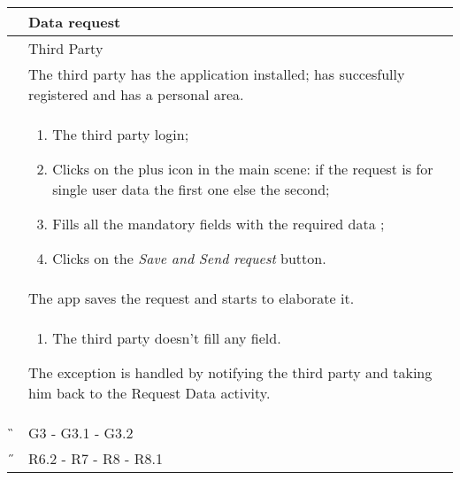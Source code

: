 \begin{center}
	\begin{longtable}{ | p{} | p{} | }
		\hline
		 \A &  Data request\\ 

		\hline
		 \B &  Third Party \\ 

		\hline
  		 \C &  The third party has the application installed; has succesfully registered and has a personal area.\\

		\hline
		\D & \begin{enumerate}
			\item The third party login;
			\item Clicks on the plus icon in the main scene: if the request is for single user data the first one else the second;
			\item Fills all the mandatory fields with the required data  ;
			\item Clicks on the \textit{Save and Send request} button.
		\end{enumerate} \\

		\hline
		\E & The app saves the request and starts to elaborate it.\\

		\hline
		\F & \begin{enumerate}
			\item The third party doesn't fill any field.
		\end{enumerate} The exception is handled by notifying the third party and taking him back to the Request Data activity. \\
		
		\hline
		\G & G3 - G3.1 - G3.2\\

		\hline
		\H & R6.2 - R7 - R8 - R8.1 \\
		\hline

	\end{longtable}
\end{center}